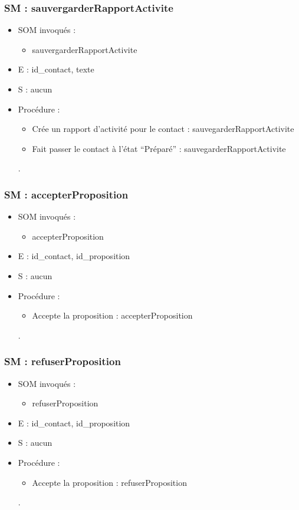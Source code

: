 \subsubsection{SM : sauvergarderRapportActivite}
\begin{itemize}
	\item SOM invoqués :
	\begin{itemize}
		\item sauvergarderRapportActivite
	\end{itemize}
	\item E : id\_contact, texte
	\item S : aucun
	\item Procédure :
	\begin{itemize}
		\item Crée un rapport d’activité pour le contact :
	sauvegarderRapportActivite
		\item Fait passer le contact à l’état “Préparé” : sauvegarderRapportActivite
	\end{itemize}.
\end{itemize}

\subsubsection{SM : accepterProposition}
\begin{itemize}
	\item SOM invoqués :
	\begin{itemize}
		\item accepterProposition
	\end{itemize}
	\item E : id\_contact, id\_proposition
	\item S : aucun
	\item Procédure :
	\begin{itemize}
		\item Accepte la proposition : accepterProposition
	\end{itemize}.
\end{itemize}

\subsubsection{SM : refuserProposition}
\begin{itemize}
	\item SOM invoqués :
	\begin{itemize}
		\item refuserProposition
	\end{itemize}
	\item E : id\_contact, id\_proposition
	\item S : aucun
	\item Procédure :
	\begin{itemize}
		\item Accepte la proposition : refuserProposition
	\end{itemize}.
\end{itemize}

